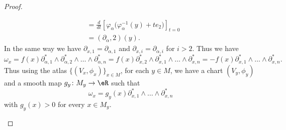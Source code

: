 \begin{proof}
\begin{subproof}
\begin{subequations}
\begin{align}
				                    & =\frac{d}{dt} \left[ \varphi_{\alpha}\big( \varphi_{\alpha}^{-1}(y)+te_2 \big)  \right]_{t=0}                        \\
				                    & =(\partial_{\alpha}, 2)(y).
			\end{align}
		\end{subequations}
		In the same way we have \( \partial_{x,1}=\partial_{\alpha,1}\) and \( \partial_{x,i}=\partial_{\alpha,i}\) for \( i>2\). Thus we have
		\begin{equation}
			\omega_x=f(x)\partial^*_{\alpha,1}\wedge\partial^*_{\alpha,2}\wedge\ldots \wedge\partial^*_{\alpha,n}=f(x)\partial^*_{x,2}\wedge\partial^*_{x,1}\wedge\ldots\wedge\partial^*_{x,n}=-f(x)\partial^*_{x,1}\wedge\ldots\wedge\partial^*_{x,n}.
		\end{equation}
		Thus using the atlas \( \{ (V_x,\phi_x) \}_{x\in M}\), for each \( y\in M\), we have a chart \( (V_y,\phi_y)\) and a smooth map \(g_y \colon M_y\to \eR  \) such that
		\begin{equation}
			\omega_x=g_y(x)\partial^*_{x,1}\wedge\ldots\wedge\partial^*_{x,n}
		\end{equation}
		with \( g_y(x)>0\) for every \( x\in M_y\).


\end{subproof}
\end{proof}
